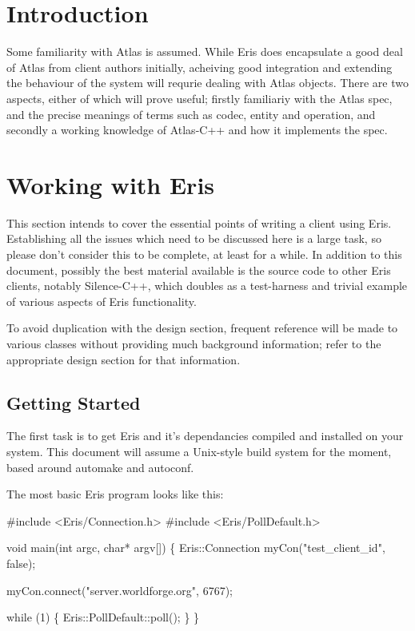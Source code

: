 \documentclass{article}
\begin{document}
\section{Introduction}

Some familiarity with Atlas is assumed. While Eris does encapsulate a good deal of Atlas
from client authors initially, acheiving good integration and extending the behaviour
of the system will requrie dealing with Atlas objects. There are two aspects, either of
which will prove useful; firstly familiariy with the Atlas spec, and the precise meanings
of terms such as codec, entity and operation, and secondly a working knowledge of Atlas-C++
and how it implements the spec.

\section{Working with Eris}

This section intends to cover the essential points of writing a client using Eris. Establishing
all the issues which need to be discussed here is a large task, so please don't consider
this to be complete, at least for a while. In addition to this document, possibly
the best material available is the source code to other Eris clients, notably Silence-C++,
which doubles as a test-harness and trivial example of various aspects of Eris functionality.

To avoid duplication with the design section, frequent reference will be made to various
classes without providing much background information; refer to the appropriate design section
for that information.

\subsection{Getting Started}
The first task is to get Eris and it's dependancies compiled and installed on your system.
This document will assume a Unix-style build system for the moment, based around
automake and autoconf.

The most basic Eris program looks like this:
{\tt

#include <Eris/Connection.h>
#include <Eris/PollDefault.h>

void main(int argc, char* argv[])
\{
    Eris::Connection myCon("test\_client\_id", false);
    
    myCon.connect("server.worldforge.org", 6767);
    
    while (1) \{
	Eris::PollDefault::poll();
    \}
\}
}
\end{document}

